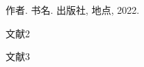 
\begin{thebibliography}{9}%

    作者.
    \newblock 书名.
    \newblock 出版社, 地点, 2022.

    文献2

     文献3

\end{thebibliography}
